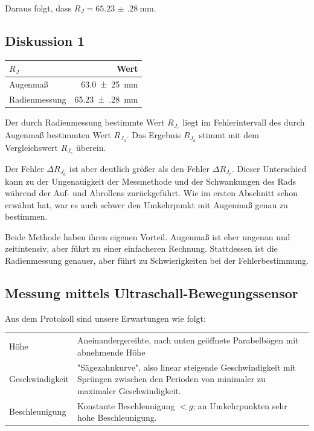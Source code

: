         Daraus folgt, dass $R_J = \SI{65.23(28)}{\milli\meter}$.

    \subsection{Diskussion 1}
        \begin{center}
            \begin{tabular} {lr}
                \toprule
                $R_J$ & Wert \\
                \midrule
                Augenmaß & \SI{63,0(25)}{\milli\meter} \\
                Radienmessung & \SI{65.23(28)}{\milli\meter} \\
                \bottomrule
            \end{tabular}
        \end{center}


        Der durch Radienmessung bestimmte Wert $R_{J_r}$ liegt im Fehlerintervall des durch Augenmaß bestimmten Wert $R_{J_a}$. Das Ergebnis $R_{J_a}$ stimmt mit dem Vergleichswert $R_{J_r}$ überein. 

        Der Fehler $\Delta R_{J_a}$ ist aber deutlich größer als den Fehler $\Delta R_{J_r}$. Dieser Unterschied kann zu der Ungenauigkeit der Messmethode und der Schwankungen des Rads während der Auf- und Abrollens zurückgeführt. Wie im ersten Abschnitt schon erwähnt hat, war es auch schwer den Umkehrpunkt mit Augenmaß genau zu bestimmen. 

        Beide Methode haben ihren eigenen Vorteil. Augenmaß ist eher ungenau und zeitintensiv, aber führt zu einer einfacheren Rechnung. Stattdessen ist die Radienmessung genauer, aber führt zu Schwierigkeiten bei der Fehlerbestimmung. 

    \subsection{Messung mittels Ultraschall-Bewegungssensor}
        Aus dem Protokoll sind unsere Erwartungen wie folgt:
        \begin{center}
            \begin{tabular}{l p{}}
                \toprule
                Höhe & Aneinandergereihte, nach unten geöffnete Parabelbögen mit abnehmende Höhe \\
                Geschwindigkeit & "Sägezahnkurve", also linear steigende Geschwindigkeit mit Sprüngen zwischen den Perioden von minimaler zu maximaler Geschwindigkeit. \\
                Beschleunigung & Konstante Beschleunigung $< g$; an Umkehrpunkten sehr hohe Beschleunigung. \\
                \bottomrule
            \end{tabular}
        \end{center}

